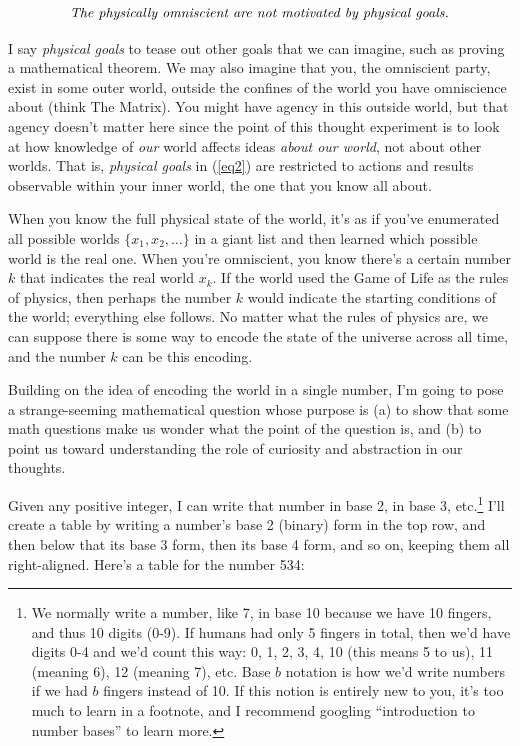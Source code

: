 \documentclass[11pt, oneside]{article}
\begin{document}
\begin{equation}\label{eq2}
    \text{\em The physically omniscient are not motivated by
    physical goals.}
\end{equation}
 
I say {\em physical goals} to tease out other goals that we can imagine, such as
proving a mathematical theorem. We may also imagine that you, the omniscient
party, exist in some outer world, outside the confines of the world you have
omniscience about (think The Matrix).
You might have agency in this outside world, but that agency doesn't matter here
since the point of this thought
experiment is to look at how knowledge of {\em our} world affects ideas {\em
about our world}, not about other worlds.
That is, {\em physical goals} in (\ref{eq2})
are restricted to actions and results observable
within your inner world, the one that you know all about.

When you know the full physical state of the world, it's as if you've
enumerated
all possible worlds $\{x_1, x_2, \ldots\}$ in a giant list and
then learned which possible world is the real one. When you're omniscient, you
know there's a certain number $k$ that indicates the real world $x_k$.
If the world used the Game of Life as the rules of physics, then perhaps the
number $k$ would indicate the starting conditions of the world; everything else
follows. No matter what the rules of physics are, we can suppose there is some
way to encode the state of the universe across all time, and the number
$k$ can be this encoding.

Building on the idea of encoding the world in a single number,
I'm going to pose a strange-seeming mathematical question whose purpose is
(a) to show that some math questions make us wonder what the
point of the question is, and (b) to point us toward understanding the role of
curiosity and abstraction in our thoughts.

Given any positive integer, I can write that number in base 2, in base 3,
etc.\footnote{We normally write a number, like 7, in base 10 because we have 10
fingers, and thus 10 digits (0-9). If humans had only 5 fingers in total, then
we'd have
digits 0-4 and we'd count this way: 0, 1, 2, 3, 4, 10 (this means 5 to us), 11
(meaning 6), 12 (meaning 7), etc. Base $b$ notation is how we'd write numbers if
we had $b$ fingers instead of 10. If this notion is entirely new to you, it's
too much to learn in a footnote, and I recommend googling ``introduction to
number bases'' to learn more.}
I'll create a table by writing a number's base 2 (binary)
form in the top row,
and then below that its base 3 form, then its base 4 form, and so on, keeping
them all right-aligned. Here's a table for the number 534:
\end{document}
